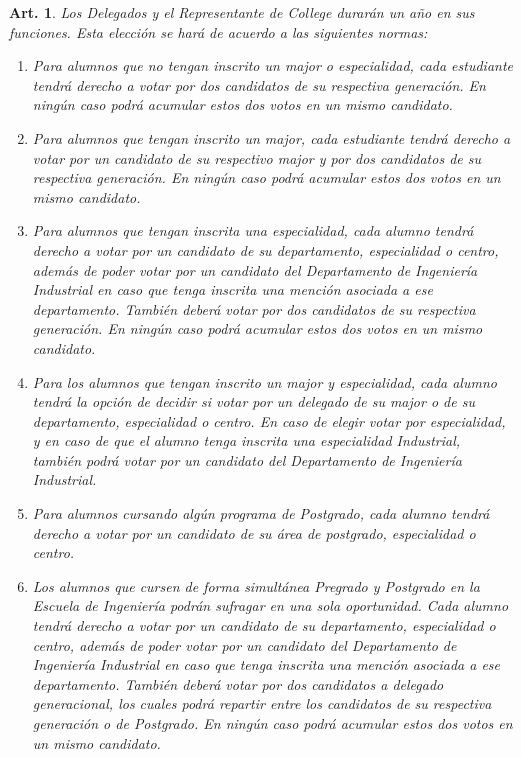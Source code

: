 \documentclass[letterpaper,11pt]{article}
\theoremstyle{plain}
\newtheorem{art}{Art.} %
\begin{document}
		\begin{art}\label{definicionesDelegados}
			Los Delegados y el Representante de College durarán un año en sus funciones. Esta elección se hará de acuerdo a las siguientes normas:
			\begin{enumerate}
				\item Para alumnos que no tengan inscrito un major o especialidad, cada estudiante tendrá derecho a votar por dos candidatos de su respectiva generación. En ningún caso podrá acumular estos dos votos en un mismo candidato.
				\item Para alumnos que tengan inscrito un major, cada estudiante tendrá derecho a votar por un candidato de su respectivo major y por dos candidatos de su respectiva generación. En ningún caso podrá acumular estos dos votos en un mismo candidato.
				\item Para alumnos que tengan inscrita una especialidad, cada alumno tendrá derecho a votar por un candidato de su departamento, especialidad o centro, además de poder votar por un candidato del Departamento de Ingeniería Industrial en caso que tenga inscrita una mención asociada a ese departamento. También deberá votar por dos candidatos de su respectiva generación. En ningún caso podrá acumular estos dos votos en un mismo candidato.
				\item Para los alumnos que tengan inscrito un major y especialidad, cada alumno tendrá la opción de decidir si votar por un delegado de su major o de su departamento, especialidad o centro. En caso de elegir votar por especialidad, y en caso de que el alumno tenga inscrita una especialidad Industrial, también podrá votar por un candidato del Departamento de Ingeniería Industrial.
				\item Para alumnos cursando algún programa de Postgrado, cada alumno tendrá derecho a votar por un candidato de su área de postgrado, especialidad o centro.
				\item Los alumnos que cursen de forma simultánea Pregrado y Postgrado en la Escuela de Ingeniería podrán sufragar en una sola oportunidad. Cada alumno tendrá derecho a votar por un candidato de su departamento, especialidad o centro, además de poder votar por un candidato del Departamento de Ingeniería Industrial en caso que tenga inscrita una mención asociada a ese departamento. También deberá votar por dos candidatos a delegado generacional, los cuales podrá repartir entre los candidatos de su respectiva generación o de Postgrado. En ningún caso podrá acumular estos dos votos en un mismo candidato.

\end{enumerate}
\end{art}
\end{document}
